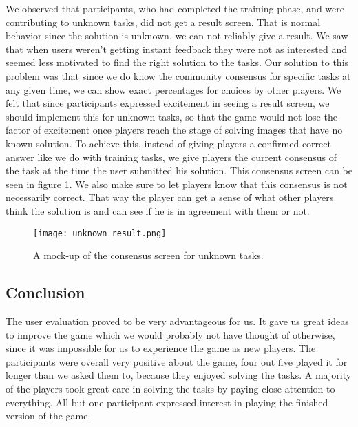 We observed that participants, who had completed the training phase, and were contributing to unknown tasks, did not get a result screen. That is normal behavior since the solution is unknown, we can not reliably give a result. We saw that when users weren't getting instant feedback they were not as interested and seemed less motivated to find the right solution to the tasks. Our solution to this problem was that since we do know the community consensus for specific tasks at any given time, we can show exact percentages for choices by other players. We felt that since participants expressed excitement in seeing a result screen, we should implement this for unknown tasks, so that the game would not lose the factor of excitement once players reach the stage of solving images that have no known solution. To achieve this, instead of giving players a confirmed correct answer like we do with training tasks, we give players the current consensus of the task at the time the user submitted his solution. This consensus screen can be seen in figure \ref{fig:consensus}. We also make sure to let players know that this consensus is not necessarily correct. That way the player can get a sense of what other players think the solution is and can see if he is in agreement with them or not.

\begin{figure}[H]
	\centering
	\graphicspath{ {./graphics/} }
	\centerline{\texttt{[image: unknown\_result.png]}}
	\caption{\label{fig:consensus}A mock-up of the consensus screen for unknown tasks.}
\end{figure}

\subsection{Conclusion}
	The user evaluation proved to be very advantageous for us. It gave us great ideas to improve the game which we would probably not have thought of otherwise, since it was impossible for us to experience the game as new players. The participants were overall very positive about the game, four out five played it for longer than we asked them to, because they enjoyed solving the tasks. A majority of the players took great care in solving the tasks by paying close attention to everything. All but one participant expressed interest in playing the finished version of the game.

